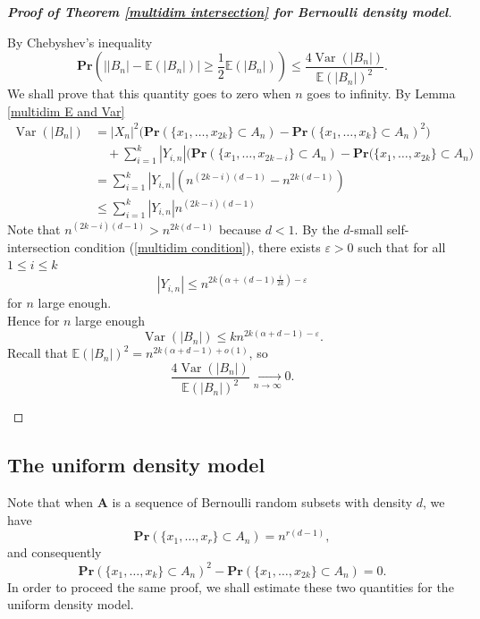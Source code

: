 \documentclass{article}
\DeclareMathOperator{\Var}{Var}
\newcommand{\bs}{\boldsymbol}
\newcommand{\tendvers}{\xrightarrow[n\to\infty]{}}
\def\Pr{\mathbf{Pr}}
\newcommand\esp[1]{\mathbb{E}\left( #1 \right)}
\theoremstyle{remark}
\begin{document}
\begin{proof}[\textbf{Proof of Theorem \ref{multidim intersection} for Bernoulli density model}]
\begin{enumerate}[(i)]
    By Chebyshev's inequality
    \[\Pr\left(\left||B_n|-\esp{|B_n|}\right| \geq \frac{1}{2}\esp{|B_n|}\right) \leq \frac{4\Var\left(|B_n|\right)}{\esp{|B_n|}^2}.\]
    We shall prove that this quantity goes to zero when $n$ goes to infinity. By Lemma \ref{multidim E and Var}
    \begin{align*} \Var(|B_n|) & =  |X_n|^2\Big(\Pr(\{x_1,\dots,x_{2k}\}\subset A_n) - \Pr(\{x_1,\dots,x_{k}\}\subset A_n)^2 \Big) \\
    & \quad + \sum_{i = 1}^{k}|Y_{i,n}| \Big(\Pr(\{x_1,\dots,x_{2k-i}\}\subset A_n) - \Pr(\{x_1,\dots,x_{2k}\}\subset A_n\Big)\\
    & = \sum_{i = 1}^{k}|Y_{i,n}| \left(n^{(2k-i)(d-1)} - n^{2k(d-1)}\right)\\
    & \leq \sum_{i = 1}^{k}|Y_{i,n}| n^{(2k-i)(d-1)}
    \end{align*}
    Note that $n^{(2k-i)(d-1)} > n^{2k(d-1)}$ because $d<1$. By the $d$-small self-intersection condition (\ref{multidim condition}), there exists $\varepsilon >0$ such that for all $1\leq i \leq k$
    \[|Y_{i,n}|\leq n^{2k\left(\alpha+(d-1)\frac{i}{2k}\right)-\varepsilon}\]
    for $n$ large enough.\\
    Hence for $n$ large enough
    \[\Var(|B_n|)\leq kn^{2k(\alpha+d-1)-\varepsilon}.\]
    Recall that $\esp{|B_n|}^2 = n^{2k(\alpha + d -1)+o(1)}$, so
    \[\frac{4\Var\left(|B_n|\right)}{\esp{|B_n|}^2} \tendvers 0.\]
    \end{enumerate}
\end{proof}

\subsection{The uniform density model}
Note that when $\bs A$ is a sequence of Bernoulli random subsets with density $d$, we have
    \[\Pr(\{x_1,\dots,x_r\}\subset A_n) = n^{r(d-1)},\]
and consequently
    \[\Pr(\{x_1,\dots,x_k\}\subset A_n)^2 - \Pr(\{x_1,\dots,x_{2k}\}\subset A_n) = 0.\]
In order to proceed the same proof, we shall estimate these two quantities for the uniform density model.
\end{document}
